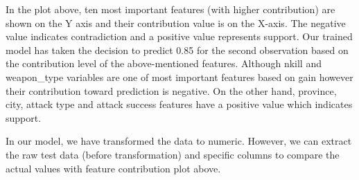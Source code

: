 \documentclass[11pt,oneside,a4paper]{reedthesis}
\newenvironment{Shaded}{\begin{snugshade}}{\end{snugshade}}
\newcommand{\KeywordTok}[1]{\textcolor[rgb]{0.13,0.29,0.53}{\textbf{#1}}}
\newcommand{\DataTypeTok}[1]{\textcolor[rgb]{0.13,0.29,0.53}{#1}}
\newcommand{\DecValTok}[1]{\textcolor[rgb]{0.00,0.00,0.81}{#1}}
\newcommand{\StringTok}[1]{\textcolor[rgb]{0.31,0.60,0.02}{#1}}
\newcommand{\CommentTok}[1]{\textcolor[rgb]{0.56,0.35,0.01}{\textit{#1}}}
\newcommand{\OtherTok}[1]{\textcolor[rgb]{0.56,0.35,0.01}{#1}}
\newcommand{\OperatorTok}[1]{\textcolor[rgb]{0.81,0.36,0.00}{\textbf{#1}}}
\newcommand{\NormalTok}[1]{#1}
\begin{document}
In the plot above, ten most important features (with higher
contribution) are shown on the Y axis and their contribution value is on
the X-axis. The negative value indicates contradiction and a positive
value represents support. Our trained model has taken the decision to
predict 0.85 for the second observation based on the contribution level
of the above-mentioned features. Although nkill and weapon\_type
variables are one of most important features based on gain however their
contribution toward prediction is negative. On the other hand, province,
city, attack type and attack success features have a positive value
which indicates support.

In our model, we have transformed the data to numeric. However, we can
extract the raw test data (before transformation) and specific columns
to compare the actual values with feature contribution plot above.
\begin{Shaded}
\end{Shaded}
\end{document}
